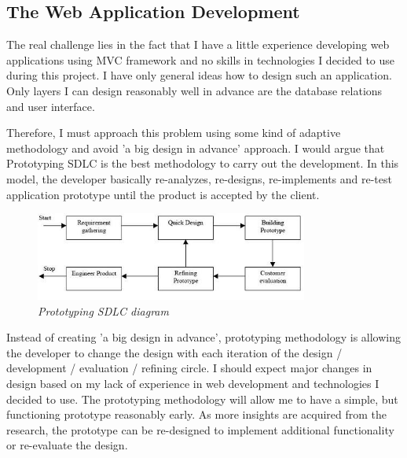 \documentclass[12pt,twoside,a4paper]{report}
\begin{document}
\subsection{The Web Application Development}\label{1.6.2}
The real challenge lies in the fact that I have a little experience developing web applications using MVC framework and no skills in technologies I decided to use during this project. I have only general ideas how to design such an application. Only layers I can design reasonably well in advance are the database relations and user interface.\par
Therefore, I must approach this problem using some kind of adaptive methodology and avoid 'a big design in advance' approach. I would argue that Prototyping SDLC is the best methodology to carry out the development. In this model, the developer basically re-analyzes, re-designs, re-implements and re-test application prototype until the product is accepted by the client.
\begin{figure}[!ht]
	\centering
		\includegraphics[width=0.8\textwidth, totalheight=5.5cm]{prototyping}
	\caption{\textit{Prototyping SDLC diagram}}
	\label{f1.1}
\end{figure}
Instead of creating 'a big design in advance', prototyping methodology is allowing the developer to change the design with each iteration of the design / development / evaluation / refining circle. I should expect major changes in design based on my lack of experience in web development and technologies I decided to use. The prototyping methodology will allow me to have a simple, but functioning prototype reasonably early. As more insights are acquired from the research, the prototype can be re-designed to implement additional functionality or re-evaluate the design.

\end{document}
